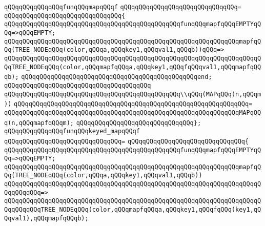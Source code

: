 \newline
\verb|qQQqqQQqqQQqqQQqfunqQQqmapqQQqf|\newline
\verb|qQQqqQQqqQQqqQQqqQQqqQQqqQQqqQQq=|\newline
\verb|qQQqqQQqqQQqqQQqqQQqqQQqqQQqqQQq{|\newline
\verb|qQQqqQQqqQQqqQQqqQQqqQQqqQQqqQQqqQQqqQQqqQQqqQQqfunqQQqmapfqQQqEMPTYqQQq=>qQQqEMPTY;|\newline
\verb|qQQqqQQqqQQqqQQqqQQqqQQqqQQqqQQqqQQqqQQqqQQqqQQqqQQqqQQqqQQqqQQqmapfqQQq(TREE_NODEqQQq(color,qQQqa,qQQqkey1,qQQqval1,qQQqb))qQQq=>|\newline
\verb|qQQqqQQqqQQqqQQqqQQqqQQqqQQqqQQqqQQqqQQqqQQqqQQqqQQqqQQqqQQqqQQqqQQqqQQqTREE_NODEqQQq(color,qQQqmapfqQQqa,qQQqkey1,qQQqfqQQqval1,qQQqmapfqQQqb);|\newline
\verb|qQQqqQQqqQQqqQQqqQQqqQQqqQQqqQQqqQQqqQQqqQQqqQQqend;|\newline
\verb|qQQqqQQqqQQqqQQqqQQqqQQqqQQqqQQqqQQqqQQq|\newline
\verb|qQQqqQQqqQQqqQQqqQQqqQQqqQQqqQQqqQQqqQQqqQQqqQQq\\qQQq(MAPqQQq(n,qQQqm))|\newline
\verb|qQQqqQQqqQQqqQQqqQQqqQQqqQQqqQQqqQQqqQQqqQQqqQQqqQQqqQQqqQQqqQQq=|\newline
\verb|qQQqqQQqqQQqqQQqqQQqqQQqqQQqqQQqqQQqqQQqqQQqqQQqqQQqqQQqqQQqqQQqMAPqQQq(n,qQQqmapfqQQqm);|\newline
\verb|qQQqqQQqqQQqqQQqqQQqqQQqqQQqqQQq};|\newline
\newline
\verb|qQQqqQQqqQQqqQQqfunqQQqkeyed_mapqQQqf|\newline
\verb|qQQqqQQqqQQqqQQqqQQqqQQqqQQqqQQq=|\newline
\verb|qQQqqQQqqQQqqQQqqQQqqQQqqQQqqQQq{|\newline
\verb|qQQqqQQqqQQqqQQqqQQqqQQqqQQqqQQqqQQqqQQqqQQqqQQqfunqQQqmapfqQQqEMPTYqQQq=>qQQqEMPTY;|\newline
\newline
\verb|qQQqqQQqqQQqqQQqqQQqqQQqqQQqqQQqqQQqqQQqqQQqqQQqqQQqqQQqqQQqqQQqmapfqQQq(TREE_NODEqQQq(color,qQQqa,qQQqkey1,qQQqval1,qQQqb))|\newline
\verb|qQQqqQQqqQQqqQQqqQQqqQQqqQQqqQQqqQQqqQQqqQQqqQQqqQQqqQQqqQQqqQQqqQQqqQQqqQQqqQQq=>|\newline
\verb|qQQqqQQqqQQqqQQqqQQqqQQqqQQqqQQqqQQqqQQqqQQqqQQqqQQqqQQqqQQqqQQqqQQqqQQqqQQqqQQqTREE_NODEqQQq(color,qQQqmapfqQQqa,qQQqkey1,qQQqfqQQq(key1,qQQqval1),qQQqmapfqQQqb);|\newline
